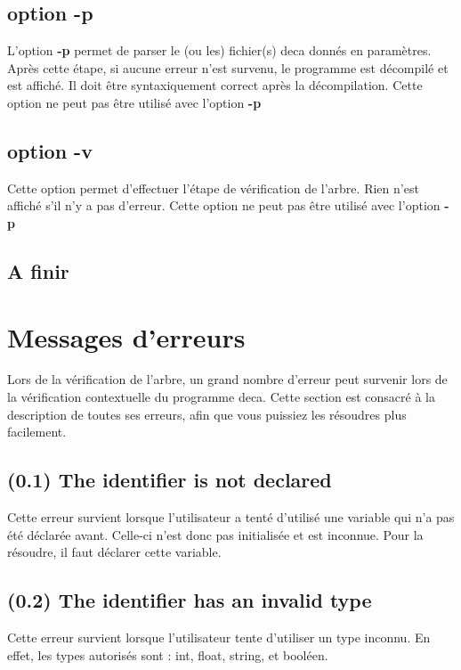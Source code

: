 \documentclass[12pt, a4paper, one side]{article}
\begin{document}
\subsection{option -p}

L'option \textbf{-p} permet de parser le (ou les) fichier(s) deca donnés en paramètres.
Après cette étape, si aucune erreur n'est survenu, le programme est décompilé et est
affiché. Il doit être syntaxiquement correct après la décompilation. Cette option ne peut
pas être utilisé avec l'option \textbf{-p}

\subsection{option -v}

Cette option permet d'effectuer l'étape de vérification de l'arbre. Rien n'est affiché s'il
n'y a pas d'erreur. Cette option ne peut pas être utilisé avec l'option \textbf{-p}

\subsection{A finir }

\section{Messages d'erreurs}

Lors de la vérification de l'arbre, un grand nombre d'erreur peut survenir lors de la vérification
contextuelle du programme deca. Cette section est consacré à la description de toutes ses erreurs,
afin que vous puissiez les résoudres plus facilement.

\subsection{(0.1) The identifier is not declared}
Cette erreur survient lorsque l'utilisateur a tenté d'utilisé une variable qui n'a pas été déclarée avant. Celle-ci n'est donc
pas initialisée et est inconnue. Pour la résoudre, il faut déclarer cette variable.

\subsection{(0.2) The identifier has an invalid type}
Cette erreur survient lorsque l'utilisateur tente d'utiliser un type inconnu. En effet, les types autorisés sont : int, float, string, et booléen.
\end{document}
